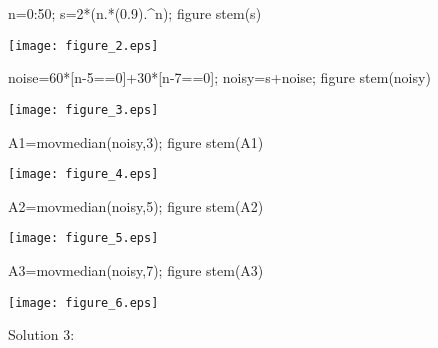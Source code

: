 \documentclass[12pt, onecolumn]{IEEEtran}
\begin{document}
\begin{matlabcode}
n=0:50;
s=2*(n.*(0.9).^n);
figure
stem(s)
\end{matlabcode}
\begin{center}
\texttt{[image: figure\_2.eps]}
\end{center}
\begin{matlabcode}
noise=60*[n-5==0]+30*[n-7==0];
noisy=s+noise;
figure
stem(noisy)
\end{matlabcode}
\begin{center}
\texttt{[image: figure\_3.eps]}
\end{center}
\begin{matlabcode}
A1=movmedian(noisy,3);
figure
stem(A1)
\end{matlabcode}
\begin{center}
\texttt{[image: figure\_4.eps]}
\end{center}
\begin{matlabcode}
A2=movmedian(noisy,5);
figure
stem(A2)
\end{matlabcode}
\begin{center}
\texttt{[image: figure\_5.eps]}
\end{center}
\begin{matlabcode}
A3=movmedian(noisy,7);
figure
stem(A3)
\end{matlabcode}
\begin{center}
\texttt{[image: figure\_6.eps]}
\end{center}

\begin{par}
\begin{flushleft}
Solution 3:
\end{flushleft}
\end{par}
\end{document}
